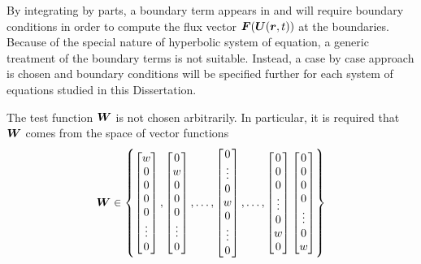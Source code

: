 By integrating by parts, a boundary term appears in  and will require boundary conditions in order to compute the flux  vector $\boldsymbol F(\boldsymbol U(\boldsymbol r, t))$ at the boundaries. Because of the special nature of hyperbolic system of equation, a generic treatment of the boundary terms is not suitable. Instead, a case by case approach is chosen and boundary conditions will be specified further for each system of equations studied in this Dissertation. 

The test function $\boldsymbol W$ is not chosen arbitrarily.
In particular, it is required that $\boldsymbol W$ comes from the space of
vector functions
\begin{align}
  \label{eqn:W_set}
  \boldsymbol W \in \left\{
      \begin{bmatrix}
        w \\ 0 \\ 0 \\ 0 \\ 0 \\ \vdots \\ 0
      \end{bmatrix},
      \begin{bmatrix}
        0 \\ w \\ 0 \\ 0 \\ 0 \\ \vdots \\ 0
      \end{bmatrix},
      \dots ,
      \begin{bmatrix}
        0 \\ \vdots \\ 0 \\ w \\ 0 \\ \vdots \\ 0
      \end{bmatrix},
      \dots ,
     \begin{bmatrix}
        0 \\ 0 \\ 0 \\ \vdots \\ 0 \\ w \\ 0
      \end{bmatrix}
      \begin{bmatrix}
        0 \\ 0 \\ 0 \\ 0 \\ \vdots \\ 0 \\ w
      \end{bmatrix}
    \right\}
\end{align}
